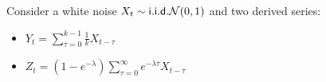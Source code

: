 Consider a white noise $X_t \sim \mathsf {i.i.d.}  \mathcal{N}(0, 1)$ and two derived series:
\begin{itemize}
	\item $Y_t = \sum _{\tau=0}^{k-1} \frac{1}{k}X_{t-\tau}$
	\item $Z_t = (1-e^{-\lambda})\sum_{\tau=0}^{\infty} e^{-\lambda \tau} X_{t-\tau}$
\end{itemize}